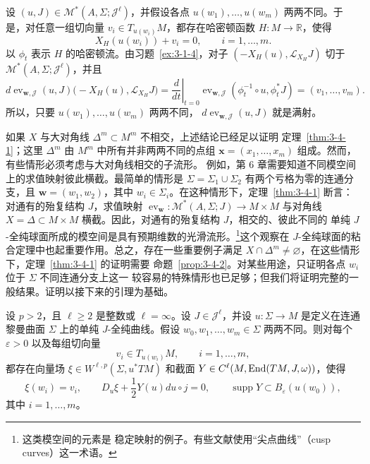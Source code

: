 设 $(u,J)\in\mathcal M^*(A,\Sigma;\mathcal J^\ell)$，并假设各点
$u(w_1),\ldots,u(w_m)$ 两两不同。于是，对任意一组切向量
$v_i\in T_{u(w_i)}M$，都存在哈密顿函数 $H:M\to\mathbb R$，使得
\[
  X_H(u(w_i))+v_i=0,\qquad i=1,\ldots,m.
\]
以 $\phi_t$ 表示 $H$ 的哈密顿流。由习题~\ref{ex:3-1-4}，对子
$(-X_H(u),\mathcal L_{X_H}J)$ 切于
$\mathcal M^*(A,\Sigma;\mathcal J^\ell)$，并且
\[
  d\operatorname{ev}_{\mathbf w,\mathcal J}(u,J)
  \bigl(-X_H(u),\mathcal L_{X_H}J\bigr)
  =\left.\frac d{dt}\right|_{t=0}
  \operatorname{ev}_{\mathbf w,\mathcal J}
  (\phi_t^{-1}\circ u,\phi_t^*J)
  =(v_1,\ldots,v_m).
\]
所以，只要 $u(w_1),\ldots,u(w_m)$ 两两不同，
$d\operatorname{ev}_{\mathbf w,\mathcal J}(u,J)$ 就是满射。

如果 $X$ 与大对角线 $\Delta^m\subset M^m$ 不相交，上述结论已经足以证明
定理~\ref{thm:3-4-1}；这里 $\Delta^m$ 由 $M^m$ 中所有并非两两不同的点组
$\mathbf x=(x_1,\ldots,x_m)$ 组成。然而，有些情形必须考虑与大对角线相交的子流形。
例如，第 6 章需要知道不同模空间上的求值映射彼此横截。最简单的情形是
$\Sigma=\Sigma_1\cup\Sigma_2$ 有两个亏格为零的连通分支，且
$\mathbf w=(w_1,w_2)$，其中 $w_i\in\Sigma_i$。在这种情形下，定理~\ref{thm:3-4-1}
断言：对通有的殆复结构 $J$，求值映射
$\operatorname{ev}_{\mathbf w}:\mathcal M^*(A,\Sigma;J)\to M\times M$ 与对角线
$X=\Delta\subset M\times M$ 横截。因此，对通有的殆复结构 $J$，相交的、彼此不同的
单纯 $J$-全纯球面所成的模空间是具有预期维数的光滑流形。\footnote{这类模空间的元素是
稳定映射的例子。有些文献使用“尖点曲线”（cusp curves）这一术语。}这个观察在
$J$-全纯球面的粘合定理中也起重要作用。总之，存在一些重要例子满足
$X\cap\Delta^m\ne\varnothing$，在这些情形下，定理~\ref{thm:3-4-1} 的证明需要
命题~\ref{prop:3-4-2}。对某些用途，只证明各点 $w_i$ 位于 $\Sigma$ 不同连通分支上这一
较容易的特殊情形也已足够；但我们将证明完整的一般结果。证明以接下来的引理为基础。

\begin{lemma}\label{lem:3-4-3}
设 $p>2$，且 $\ell\ge2$ 是整数或 $\ell=\infty$。设 $J\in\mathcal J^\ell$，并设
$u:\Sigma\to M$ 是定义在连通黎曼曲面 $\Sigma$ 上的单纯 $J$-全纯曲线。假设
$w_0,w_1,\ldots,w_m\in\Sigma$ 两两不同。则对每个 $\varepsilon>0$ 以及每组切向量
\[
  v_i\in T_{u(w_i)}M,\qquad i=1,\ldots,m,
\]
都存在向量场 $\xi\in W^{\ell,p}(\Sigma,u^*TM)$ 和截面
$Y\in C^\ell(M,\operatorname{End}(TM,J,\omega))$，使得
\begin{equation}\label{eq:3-4-1}
  \xi(w_i)=v_i,\qquad
  D_u\xi+\frac12Y(u)du\circ j=0,\qquad
  \operatorname{supp}Y\subset B_\varepsilon(u(w_0)),
\end{equation}
其中 $i=1,\ldots,m$。
\end{lemma}

